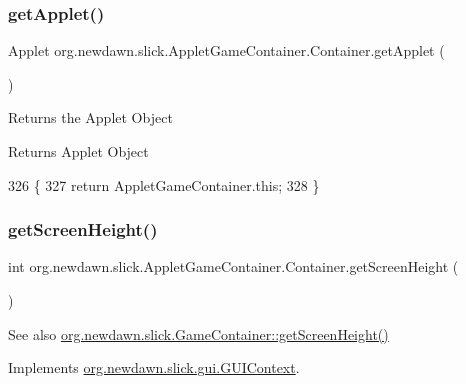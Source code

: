 \subsubsection{\texorpdfstring{get\+Applet()}{getApplet()}}
{\footnotesize\ttfamily Applet org.\+newdawn.\+slick.\+Applet\+Game\+Container.\+Container.\+get\+Applet (\begin{DoxyParamCaption}{ }\end{DoxyParamCaption})\hspace{0.3cm}{\ttfamily [inline]}}

Returns the Applet Object \begin{DoxyReturn}{Returns}
Applet Object 
\end{DoxyReturn}

\begin{DoxyCode}
326                                 \{
327          \textcolor{keywordflow}{return} AppletGameContainer.this;
328       \}
\end{DoxyCode}
\mbox{\label{classorg_1_1newdawn_1_1slick_1_1_applet_game_container_1_1_container_a60319d829f6ae2a5cfd74408738b2e68}} 
\subsubsection{\texorpdfstring{get\+Screen\+Height()}{getScreenHeight()}}
{\footnotesize\ttfamily int org.\+newdawn.\+slick.\+Applet\+Game\+Container.\+Container.\+get\+Screen\+Height (\begin{DoxyParamCaption}{ }\end{DoxyParamCaption})\hspace{0.3cm}{\ttfamily [inline]}}

\begin{DoxySeeAlso}{See also}
\mbox{\hyperlink{classorg_1_1newdawn_1_1slick_1_1_game_container_afdb008e76bcbc6de23e783670c044f28}{org.\+newdawn.\+slick.\+Game\+Container\+::get\+Screen\+Height()}} 
\end{DoxySeeAlso}


Implements \mbox{\hyperlink{interfaceorg_1_1newdawn_1_1slick_1_1gui_1_1_g_u_i_context_ad7b27d047f72ef86c1ec448492a16d6a}{org.\+newdawn.\+slick.\+gui.\+G\+U\+I\+Context}}.


